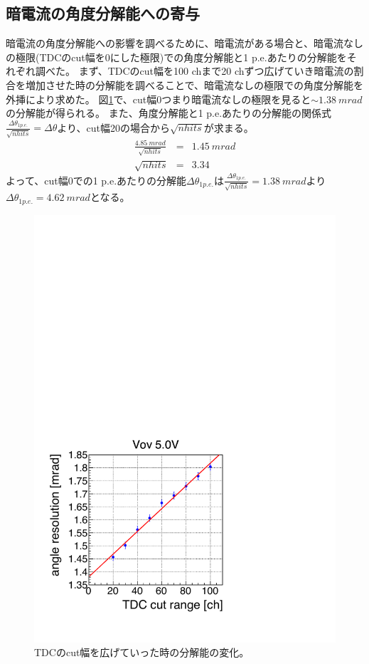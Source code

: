 \documentclass[uplatex, titlepage, dvipdfmx, 12pt, a4paper]{jsreport}
\begin{document}
    \subsection{暗電流の角度分解能への寄与}
    暗電流の角度分解能への影響を調べるために、暗電流がある場合と、暗電流なしの極限(TDCのcut幅を0にした極限)での角度分解能と1 p.e.あたりの分解能をそれぞれ調べた。
    まず、TDCのcut幅を100 chまで20 chずつ広げていき暗電流の割合を増加させた時の分解能を調べることで、暗電流なしの極限での角度分解能を外挿により求めた。
    図\ref{fig:reso_tdc}で、cut幅0つまり暗電流なしの極限を見ると$\sim\SI{1.38}{mrad}$の分解能が得られる。
    また、角度分解能と1 p.e.あたりの分解能の関係式$\frac{\Delta \theta_{1 p.e.}}{\sqrt{nhits}}=\Delta \theta$より、cut幅20の場合から$\sqrt{nhits}$が求まる。
    \begin{eqnarray}
      \frac{\SI{4.85}{mrad}}{\sqrt{nhits}}&=&\SI{1.45}{mrad} \nonumber \\
      \sqrt{nhits} &=& 3.34 \nonumber 
    \end{eqnarray}
    よって、cut幅0での1 p.e.あたりの分解能$\Delta \theta_{1 p.e.}$は$\frac{\Delta \theta_{1 p.e.}}{\sqrt{nhits}}=\SI{1.38}{mrad}$より
    $\Delta\theta_{1 p.e.}=\SI{4.62}{mrad}$となる。
    \begin{figure}[h]
      \begin{center} 
        \includegraphics[scale=0.4, clip]{image/reso_tdc.pdf}
        \caption{TDCのcut幅を広げていった時の分解能の変化。} 
        \label{fig:reso_tdc} 
      \end{center}
    \end{figure}
\end{document}
